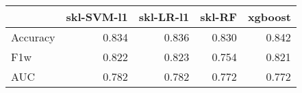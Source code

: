 \begin{tabular}{lrrrr}
\toprule
{} &  skl-SVM-l1 &  skl-LR-l1 &  skl-RF &  xgboost \\
\midrule
Accuracy &       0.834 &      0.836 &   0.830 &    0.842 \\
F1w      &       0.822 &      0.823 &   0.754 &    0.821 \\
AUC      &       0.782 &      0.782 &   0.772 &    0.772 \\
\bottomrule
\end{tabular}
